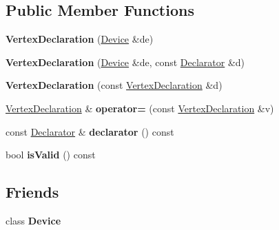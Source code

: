 \subsection*{Public Member Functions}
\begin{DoxyCompactItemize}
\item 
\hypertarget{class_tempest_1_1_vertex_declaration_adeb2de9ee0c7471b5d3ddad636a9c303}{{\bfseries Vertex\+Declaration} (\hyperlink{class_tempest_1_1_device}{Device} \&de)}\label{class_tempest_1_1_vertex_declaration_adeb2de9ee0c7471b5d3ddad636a9c303}

\item 
\hypertarget{class_tempest_1_1_vertex_declaration_a4014e3f8d7c0a6a98429612a04a8abe9}{{\bfseries Vertex\+Declaration} (\hyperlink{class_tempest_1_1_device}{Device} \&de, const \hyperlink{class_tempest_1_1_vertex_declaration_1_1_declarator}{Declarator} \&d)}\label{class_tempest_1_1_vertex_declaration_a4014e3f8d7c0a6a98429612a04a8abe9}

\item 
\hypertarget{class_tempest_1_1_vertex_declaration_a632298efa2fcf0b15659b76ca9f53278}{{\bfseries Vertex\+Declaration} (const \hyperlink{class_tempest_1_1_vertex_declaration}{Vertex\+Declaration} \&d)}\label{class_tempest_1_1_vertex_declaration_a632298efa2fcf0b15659b76ca9f53278}

\item 
\hypertarget{class_tempest_1_1_vertex_declaration_ae3127ac1d19c426a69730d9b6fd26dfa}{\hyperlink{class_tempest_1_1_vertex_declaration}{Vertex\+Declaration} \& {\bfseries operator=} (const \hyperlink{class_tempest_1_1_vertex_declaration}{Vertex\+Declaration} \&v)}\label{class_tempest_1_1_vertex_declaration_ae3127ac1d19c426a69730d9b6fd26dfa}

\item 
\hypertarget{class_tempest_1_1_vertex_declaration_a58e607a6f2695c23e9eef23c1c290a9a}{const \hyperlink{class_tempest_1_1_vertex_declaration_1_1_declarator}{Declarator} \& {\bfseries declarator} () const }\label{class_tempest_1_1_vertex_declaration_a58e607a6f2695c23e9eef23c1c290a9a}

\item 
\hypertarget{class_tempest_1_1_vertex_declaration_a78495e804cb6692102e8097ad2ebed34}{bool {\bfseries is\+Valid} () const }\label{class_tempest_1_1_vertex_declaration_a78495e804cb6692102e8097ad2ebed34}

\end{DoxyCompactItemize}
\subsection*{Friends}
\begin{DoxyCompactItemize}
\item 
\hypertarget{class_tempest_1_1_vertex_declaration_a520fa05e0bf58785da428f7a0241eee2}{class {\bfseries Device}}\label{class_tempest_1_1_vertex_declaration_a520fa05e0bf58785da428f7a0241eee2}

\end{DoxyCompactItemize}


